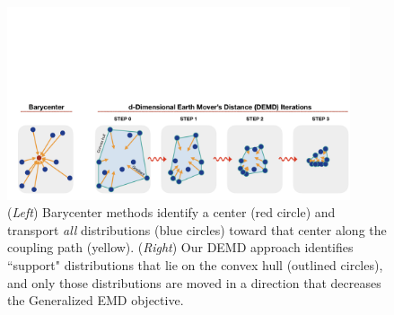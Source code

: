 \begin{figure}
    \centering
    \includegraphics[trim={2cm, 0, 0, 18cm},clip,width=0.9\textwidth]{6_demd/figs/demd_hull_v3.png}
    \caption{\footnotesize ({\em Left}) Barycenter methods identify a center (red circle) and transport \textit{all} distributions (blue circles) toward that center along the coupling path (yellow). ({\em Right}) Our DEMD approach identifies ``support" distributions that lie on the convex hull (outlined circles),  and only those distributions are moved in a direction that decreases the Generalized EMD objective.}
    \label{fig:min_demd}
    \vspace{-5pt}
\end{figure}




